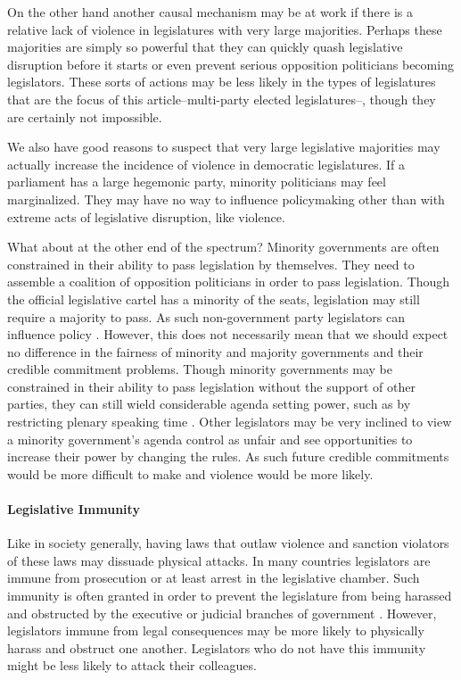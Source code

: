 \documentclass[a4paper]{article}\usepackage[]{graphicx}\usepackage[]{color}
\begin{document}
On the other hand another causal mechanism may be at work if there is a relative lack of violence in legislatures with very large majorities. Perhaps these majorities are simply so powerful that they can quickly quash legislative disruption before it starts or even prevent serious opposition politicians becoming legislators. These sorts of actions may be less likely in the types of legislatures that are the focus of this article--multi-party elected legislatures--, though they are certainly not impossible.

We also have good reasons to suspect that very large legislative majorities may actually increase the incidence of violence in democratic legislatures. If a parliament has a large hegemonic party, minority politicians may feel marginalized. They may have no way to influence policymaking other than with extreme acts of legislative disruption, like violence.

What about at the other end of the spectrum? Minority governments are often constrained in their ability to pass legislation by themselves. They need to assemble a coalition of opposition politicians in order to pass legislation. Though the official legislative cartel has a minority of the seats, legislation may still require a majority to pass. As such non-government party legislators can influence policy \citep{strom1990minority}. However, this does not necessarily mean that we should expect no difference in the fairness of minority and majority governments and their credible commitment problems. Though minority governments may be constrained in their ability to pass legislation without the support of other parties, they can still wield considerable agenda setting power, such as by restricting plenary speaking time \citep{Tsebelis2002,cox2005,cox2007}. Other legislators may be very inclined to view a minority government's agenda control as unfair and see opportunities to increase their power by changing the rules. As such future credible commitments would be more difficult to make and violence would be more likely.

\paragraph{Legislative Immunity}

Like in society generally, having laws that outlaw violence and sanction violators of these laws may dissuade physical attacks. In many countries legislators are immune from prosecution or at least arrest in the legislative chamber. Such immunity is often granted in order to prevent the legislature from being harassed and obstructed by the executive or judicial branches of government  \citep{Seghetti1984}. However, legislators immune from legal consequences may be more likely to physically harass and obstruct one another. Legislators who do not have this immunity might be less likely to attack their colleagues.
\end{document}
